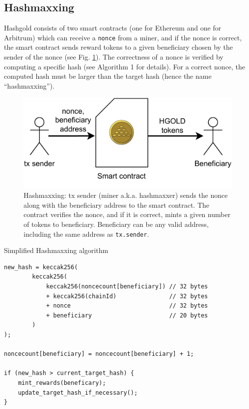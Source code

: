 \documentclass[12pt, a4paper]{article}
\begin{document}
\subsection{Hashmaxxing}
Hashgold consists of two smart contracts (one for Ethereum and one for Arbitrum) which can receive a \texttt{nonce} from a miner, and if the nonce is correct, the smart contract sends reward tokens to a given beneficiary chosen by the sender of the nonce (see Fig. \ref{fig:hashmaxxxing}). The correctness of a nonce is verified by computing a specific hash (see Algorithm 1 for details). For a correct nonce, the computed hash must be larger than the target hash (hence the name ``hashmaxxing''). 
\begin{figure}[H]
    \centering
    \includegraphics{figures/tx-v2.drawio.pdf}
    \caption{Hashmaxxing: tx sender (miner a.k.a. hashmaxxer) sends the nonce along with the beneficiary address to the smart contract. The contract verifies the nonce, and if it is correct, mints a given number of tokens to beneficiary. Beneficiary can be any valid address, including the same address as \texttt{tx.sender}.}
    \label{fig:hashmaxxxing}
\end{figure}


\begin{algorithm}[H]
\caption{Simplified Hashmaxxing algorithm}\label{alg:hashmaxxing}
\begin{lstlisting}
new_hash = keccak256(
        keccak256(
            keccak256(noncecount[beneficiary]) // 32 bytes
            + keccak256(chainId)               // 32 bytes
            + nonce                            // 32 bytes
            + beneficiary                      // 20 bytes
        )
);

noncecount[beneficiary] = noncecount[beneficiary] + 1;

if (new_hash > current_target_hash) {
    mint_rewards(beneficary);
    update_target_hash_if_necessary();
}
\end{lstlisting}

\end{algorithm}
\end{document}
